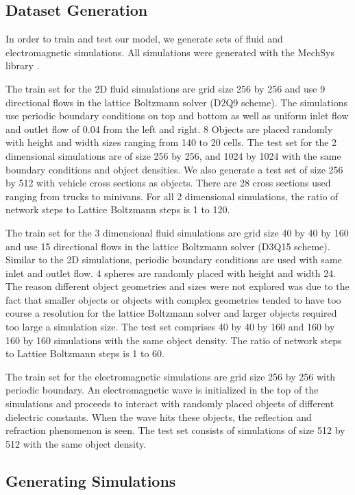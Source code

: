\documentclass{article}
\begin{document}
\subsection{Dataset Generation}
In order to train and test our model, we generate sets of fluid and electromagnetic simulations. All simulations were generated with the MechSys library \cite{mechsys}.

The train set for the 2D fluid simulations are grid size 256 by 256 and use 9 directional flows in the lattice Boltzmann solver (D2Q9 scheme)\cite{guo2013lattice}. The simulations use periodic boundary conditions on top and bottom as well as uniform inlet flow and outlet flow of 0.04 from the left and right. 8 Objects are placed randomly with height and width sizes ranging from 140 to 20 cells. The test set for the 2 dimensional simulations are of size 256 by 256, and 1024 by 1024 with the same boundary conditions and object densities. We also generate a test set of size 256 by 512 with vehicle cross sections as objects. There are 28 cross sections used ranging from trucks to minivans. For all 2 dimensional simulations, the ratio of network steps to Lattice Boltzmann steps is 1 to 120.

The train set for the 3 dimensional fluid simulations are grid size 40 by 40 by 160 and use 15 directional flows in the lattice Boltzmann solver (D3Q15 scheme)\cite{guo2013lattice}. Similar to the 2D simulations, periodic boundary conditions are used with same inlet and outlet flow. 4 spheres are randomly placed with height and width 24. The reason different object geometries and sizes were not explored was due to the fact that smaller objects or objects with complex geometries tended to have too course a resolution for the lattice Boltzmann solver and larger objects required too large a simulation size. The test set comprises 40 by 40 by 160 and 160 by 160 by 160 simulations with the same object density. The ratio of network steps to Lattice Boltzmann steps is 1 to 60.

The train set for the electromagnetic simulations are grid size 256 by 256 with periodic boundary. An electromagnetic wave is initialized in the top of the simulations and proceeds to interact with randomly placed objects of different dielectric constants. When the wave hits these objects, the reflection and refraction phenomenon is seen. The test set consists of simulations of size 512 by 512 with the same object density.

\subsection{Generating Simulations}
\end{document}

